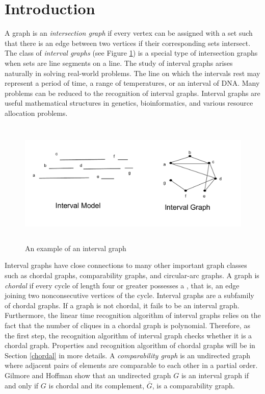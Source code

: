 \section{Introduction}
A graph is an \emph{intersection graph} if every vertex can be assigned with a set such that there is an edge between two vertices if their corresponding sets intersect. The class of \emph{interval graphs} (see Figure \ref{interval_graph}) is a special type of intersection graphs when sets are line segments on a line. The study of interval graphs arises naturally in solving real-world problems. The line on which the intervals rest may represent a period of time, a range of temperatures, or an interval of DNA. Many problems can be reduced to the recognition of interval graphs. Interval graphs are useful mathematical structures in genetics, bioinformatics, and various resource allocation problems.

\begin{figure}[H]
\centering
\includegraphics[width=12cm,height=6cm]{figures/interval_graph.pdf}
\caption{An example of an interval graph}
\label{interval_graph}
\end{figure}


Interval graphs have close connections to many other important graph classes such as chordal graphs, comparability graphs, and circular-arc graphs. A graph is \emph{chordal} if every cycle of length four or greater possesses a , that is, an edge joining two nonconsecutive vertices of the cycle. Interval graphs are a subfamily of chordal graphs. If a graph is not chordal, it fails to be an interval graph. Furthermore, the linear time recognition algorithm of interval graphs relies on the fact that the number of cliques in a chordal graph is polynomial. Therefore, as the first step, the recognition algorithm of interval graph checks whether it is a chordal graph. Properties and recognition algorithm of chordal graphs will be in Section \ref{chordal} in more details. A \emph{comparability graph} is an undirected graph where adjacent pairs of elements are comparable to each other in a partial order. Gilmore and Hoffman\cite{gilmore1964characterization} show that an undirected graph $G$ is an interval graph if and only if $G$ is chordal and its complement, $\bar{G}$, is a comparability graph. 

